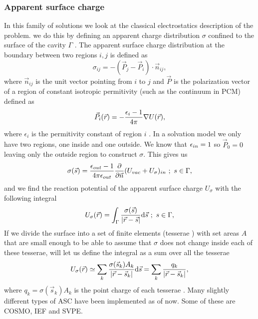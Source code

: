 \documentclass[../master_thesis.tex]{subfiles}
\begin{document}
\subsubsection{Apparent surface charge}
In this family of solutions we look at the classical electrostatics description
of the problem. we do this by defining an apparent charge distribution
$\sigma$ confined to the surface of the cavity $\Gamma$ \cite{Tomasi:1994wt, Tomasi:2005ipa}.
The apparent surface charge distribution at the boundary between two regions $i, j$
is defined as
\begin{equation}
  \sigma_{ij} = -(\vec{P}_j - \vec{P}_i)\cdot\vec{n}_{ij},
\end{equation}
where $\vec{n}_{ij}$ is the unit vector pointing from $i$ to $j$ and $\vec{P}$ is
the polarization vector of a region of constant isotropic permitivity (such as
the continuum in \ac{PCM}) defined as
\begin{equation}
  \vec{P}_i (\vec{r}) = - \frac{\epsilon_i - 1}{4\pi}\nabla U(\vec{r}),
\end{equation}
where $\epsilon_i$ is the permitivity constant of region $i$ \cite{Tomasi:2005ipa}.
In a solvation model we only have two regions, one inside and one outside. We
know that $\epsilon_{in} = 1$ so $\vec{P}_0 = 0$ leaving only the outside region to
construct $\sigma$. This gives us \cite{Tomasi:2005ipa}
\begin{equation}\label{eq:asc}
  \sigma(\vec{s}) =\frac{\epsilon_{out} - 1}{4\pi\epsilon_{out}} \frac{\partial}{\partial\vec{n}} (U_{vac} + U_{\sigma})_{in}\ ;\ s \in \Gamma,
\end{equation}
and we find the reaction potential of the apparent surface charge $U_{\sigma}$
with the following integral
 \begin{equation}
   U_{\sigma}(\vec{r}) = \int_{\Gamma}\frac{\sigma(\vec{s})}{\abs{\vec{r} - \vec{s}}} \text{d}\vec{s}\ ;\ s \in \Gamma,
 \end{equation}
If we divide the surface into a set of finite elements (tesserae
\cite{Tomasi:2005ipa, Sorland}) with set areas $A$ that are small enough to be able
to assume that $\sigma$ does not change inside each of these tesserae, will let us define the integral
as a sum over all the tesserae
\begin{equation}
   U_{\sigma}(\vec{r}) \simeq \sum_k\frac{\sigma(\vec{s}_k) A_k}{\abs{\vec{r} - \vec{s}_k}} \text{d}\vec{s}
   = \sum_k\frac{q_k}{\abs{\vec{r} - \vec{s}_k}},
\end{equation}
where $q_k = \sigma(\vec{s}_k) A_k$ is the point charge of each tesserae
\cite{Tomasi:2005ipa}.
Many slightly different types of \ac{ASC} have been implemented as of now. Some of these
are \ac{COSMO}, \ac{IEF} and \ac{SVPE}.
\end{document}
